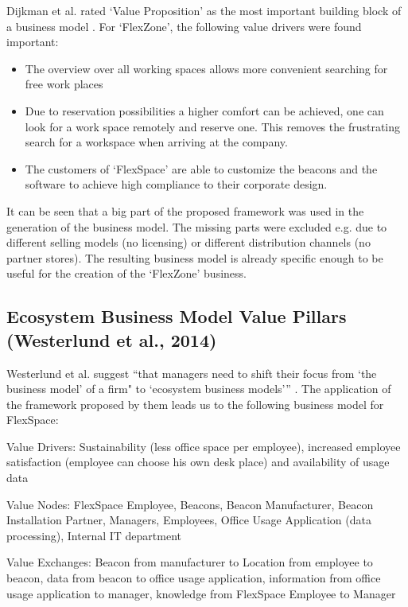	Dijkman et al.  rated `Value Proposition' as the most important building block of a business model \cite{dijkman}. For `FlexZone', the following value drivers were found important:
	\begin{itemize}
		\item The overview over all working spaces allows more convenient searching for free work places
		\item Due to reservation possibilities a higher comfort can be achieved, one can look for a work space remotely and reserve one. This removes the frustrating search for a workspace when arriving at the company.
		\item The customers of `FlexSpace' are able to customize the beacons and the software to achieve high compliance to their corporate design.  
	\end{itemize}  


	It can be seen that a big part of the proposed framework was used in the generation of the business model. The missing parts were excluded e.g. due to different selling models (no licensing) or different distribution channels (no partner stores). The resulting business model is already specific enough to be useful for the creation of the `FlexZone' business. 
	\subsection{Ecosystem Business Model Value Pillars (Westerlund et al., 2014)}
		Westerlund et al. suggest ``that managers need to shift their focus from `the business model' of a firm" to `ecosystem business models''' \cite[p. 8]{westerlund}. The application of the framework proposed by them leads us to the following business model for FlexSpace:

		Value Drivers: Sustainability (less office space per employee), increased employee satisfaction (employee can choose his own desk place) and availability of usage data

		Value Nodes: FlexSpace Employee, Beacons, Beacon Manufacturer, Beacon Installation Partner, Managers, Employees, Office Usage Application (data processing), Internal IT department

		Value Exchanges: Beacon from manufacturer to Location from employee to beacon, data from beacon to office usage application, information from office usage application to manager, knowledge from FlexSpace Employee to Manager

